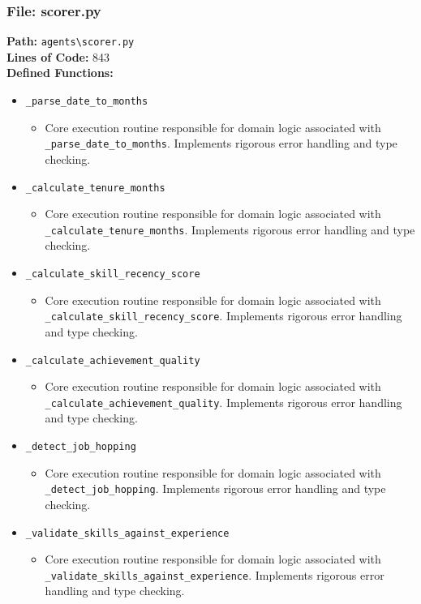 \documentclass[10pt,journal,compsoc]{IEEEtran}
\begin{document}
\subsubsection{File: scorer.py}
\textbf{Path:} \texttt{agents\textbackslash{}scorer.py} \\
\textbf{Lines of Code:} 843 \\
\textbf{Defined Functions:}
\begin{itemize}
    \item \texttt{\_parse\_date\_to\_months}
    \begin{itemize} \item Core execution routine responsible for domain logic associated with \texttt{\_parse\_date\_to\_months}. Implements rigorous error handling and type checking. \end{itemize}
    \item \texttt{\_calculate\_tenure\_months}
    \begin{itemize} \item Core execution routine responsible for domain logic associated with \texttt{\_calculate\_tenure\_months}. Implements rigorous error handling and type checking. \end{itemize}
    \item \texttt{\_calculate\_skill\_recency\_score}
    \begin{itemize} \item Core execution routine responsible for domain logic associated with \texttt{\_calculate\_skill\_recency\_score}. Implements rigorous error handling and type checking. \end{itemize}
    \item \texttt{\_calculate\_achievement\_quality}
    \begin{itemize} \item Core execution routine responsible for domain logic associated with \texttt{\_calculate\_achievement\_quality}. Implements rigorous error handling and type checking. \end{itemize}
    \item \texttt{\_detect\_job\_hopping}
    \begin{itemize} \item Core execution routine responsible for domain logic associated with \texttt{\_detect\_job\_hopping}. Implements rigorous error handling and type checking. \end{itemize}
    \item \texttt{\_validate\_skills\_against\_experience}
    \begin{itemize} \item Core execution routine responsible for domain logic associated with \texttt{\_validate\_skills\_against\_experience}. Implements rigorous error handling and type checking. \end{itemize}

\end{itemize}
\end{document}
